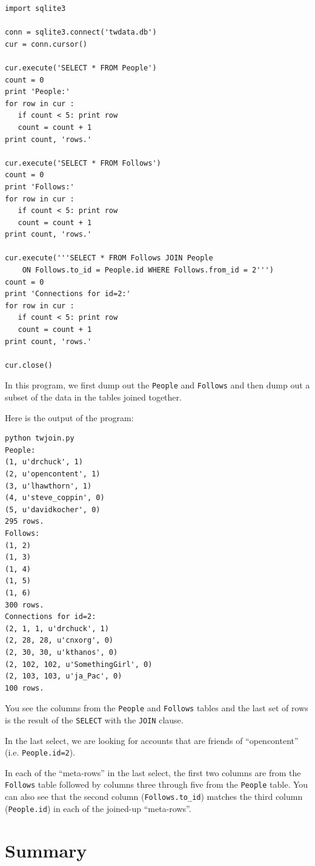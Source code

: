 \documentclass[10pt]{book}
\begin{document}
\beforeverb
\begin{verbatim}
import sqlite3

conn = sqlite3.connect('twdata.db')
cur = conn.cursor()

cur.execute('SELECT * FROM People')
count = 0
print 'People:'
for row in cur :
   if count < 5: print row
   count = count + 1
print count, 'rows.'

cur.execute('SELECT * FROM Follows')
count = 0
print 'Follows:'
for row in cur :
   if count < 5: print row
   count = count + 1
print count, 'rows.'

cur.execute('''SELECT * FROM Follows JOIN People 
    ON Follows.to_id = People.id WHERE Follows.from_id = 2''')
count = 0
print 'Connections for id=2:'
for row in cur :
   if count < 5: print row
   count = count + 1
print count, 'rows.'

cur.close()
\end{verbatim}
\afterverb
%
In this program, we first dump out the {\tt People}
and {\tt Follows} and then dump out a subset of the
data in the tables joined together.

Here is the output of the program:

\beforeverb
\begin{verbatim}
python twjoin.py 
People:
(1, u'drchuck', 1)
(2, u'opencontent', 1)
(3, u'lhawthorn', 1)
(4, u'steve_coppin', 0)
(5, u'davidkocher', 0)
295 rows.
Follows:
(1, 2)
(1, 3)
(1, 4)
(1, 5)
(1, 6)
300 rows.
Connections for id=2:
(2, 1, 1, u'drchuck', 1)
(2, 28, 28, u'cnxorg', 0)
(2, 30, 30, u'kthanos', 0)
(2, 102, 102, u'SomethingGirl', 0)
(2, 103, 103, u'ja_Pac', 0)
100 rows.
\end{verbatim}
\afterverb
%
You see the columns from the {\tt People} and {\tt Follows} tables and the last
set of rows is the result of the {\tt SELECT} with the {\tt JOIN} clause.

In the last select, we are looking for accounts that are friends of 
``opencontent'' (i.e. {\tt People.id=2}).

In each of the ``meta-rows'' in the last select, the first two columns are
from the {\tt Follows}
table followed by columns three through five from the {\tt People} table.  You can also
see that the second column (\verb"Follows.to_id") matches the third column
({\tt People.id}) in each of the joined-up ``meta-rows''.

\section{Summary}
\end{document}
